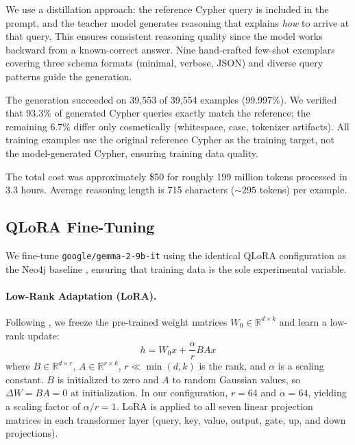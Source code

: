 \documentclass[11pt]{article}
\begin{document}
We use a distillation approach: the reference Cypher query is included in the prompt, and the teacher model generates reasoning that explains \emph{how} to arrive at that query. This ensures consistent reasoning quality since the model works backward from a known-correct answer. Nine hand-crafted few-shot exemplars covering three schema formats (minimal, verbose, JSON) and diverse query patterns guide the generation.

The generation succeeded on 39,553 of 39,554 examples (99.997\%). We verified that 93.3\% of generated Cypher queries exactly match the reference; the remaining 6.7\% differ only cosmetically (whitespace, case, tokenizer artifacts). All training examples use the original reference Cypher as the training target, not the model-generated Cypher, ensuring training data quality.

The total cost was approximately \$50 for roughly 199 million tokens processed in 3.3 hours. Average reasoning length is 715 characters (${\sim}295$ tokens) per example.

\subsection{QLoRA Fine-Tuning}

We fine-tune \texttt{google/gemma-2-9b-it} using the identical QLoRA configuration as the Neo4j baseline \citep{ozsoy2025text2cypher}, ensuring that training data is the sole experimental variable.

\paragraph{Low-Rank Adaptation (LoRA).} Following \citet{hu2021lora}, we freeze the pre-trained weight matrices $W_0 \in \mathbb{R}^{d \times k}$ and learn a low-rank update:
\begin{equation}
    h = W_0 x + \frac{\alpha}{r} B A x
\end{equation}
where $B \in \mathbb{R}^{d \times r}$, $A \in \mathbb{R}^{r \times k}$, $r \ll \min(d, k)$ is the rank, and $\alpha$ is a scaling constant. $B$ is initialized to zero and $A$ to random Gaussian values, so $\Delta W = BA = 0$ at initialization. In our configuration, $r = 64$ and $\alpha = 64$, yielding a scaling factor of $\alpha / r = 1$. LoRA is applied to all seven linear projection matrices in each transformer layer (query, key, value, output, gate, up, and down projections).
\end{document}
